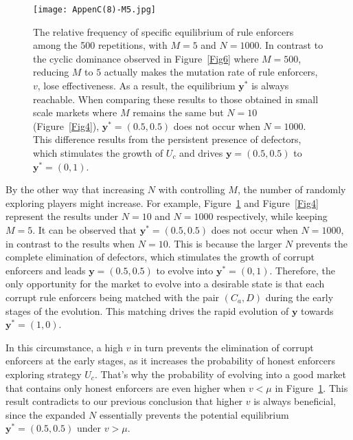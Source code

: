 \documentclass[letterpaper,10pt]{article}
\numberwithin{equation}{section}
\begin{document}
\begin{figure}[H]
    \begin{center}
        \texttt{[image: AppenC(8)-M5.jpg]}
    \end{center}
    \caption{The relative frequency of specific equilibrium of rule enforcers among the 500 repetitions, with $ M = 5 $ and $ N = 1000 $. In contrast to the cyclic dominance observed in Figure~\ref{Fig6} where $ M = 500 $, reducing $ M $ to $ 5 $ actually makes the mutation rate of rule enforcers, $ v $, lose effectiveness. As a result, the equilibrium $ \mathbf{y}^* $ is always reachable. When comparing these results to those obtained in small scale markets where $ M $ remains the same but $ N = 10 $ (Figure~\ref{Fig4}), $ \mathbf{y}^* = (0.5, 0.5) $ does not occur when $ N = 1000 $. This difference results from the persistent presence of defectors, which stimulates the growth of $ U_{c} $ and drives $ \mathbf{y} = (0.5, 0.5) $ to $ \mathbf{y}^*= (0, 1) $.}
    \label{AppenC8-M5}
\end{figure}

By the other way that increasing $ N $ with controlling $ M $, the number of randomly exploring players might increase. For example, Figure~\ref{AppenC8-M5} and Figure~\ref{Fig4} represent the results under $ N = 10 $ and $ N = 1000 $ respectively, while keeping $ M = 5 $. It can be observed that $ \mathbf{y}^* = (0.5, 0.5) $ does not occur when $ N = 1000 $, in contrast to the results when $ N=10 $. This is because the larger $ N $ prevents the complete elimination of defectors, which stimulates the growth of corrupt enforcers and leads $ \mathbf{y} = (0.5, 0.5) $ to evolve into $ \mathbf{y}^* = (0, 1) $. Therefore, the only opportunity for the market to evolve into a desirable state is that each corrupt rule enforcers being matched with the pair $ (C_{a}, D) $ during the early stages of the evolution. This matching drives the rapid evolution of $ \mathbf{y} $ towards $ \mathbf{y}^* = (1, 0) $.

In this circumstance, a high $ v $ in turn prevents the elimination of corrupt enforcers at the early stages, as it increases the probability of honest enforcers exploring strategy $ U_{c} $. That's why the probability of evolving into a good market that contains only honest enforcers are even higher when $ v < \mu $ in Figure~\ref{AppenC8-M5}. This result contradicts to our previous conclusion that higher $ v $ is always beneficial, since the expanded $ N $ essentially prevents the potential equilibrium $ \mathbf{y}^* = (0.5, 0.5) $ under $ v > \mu $.
\end{document}
